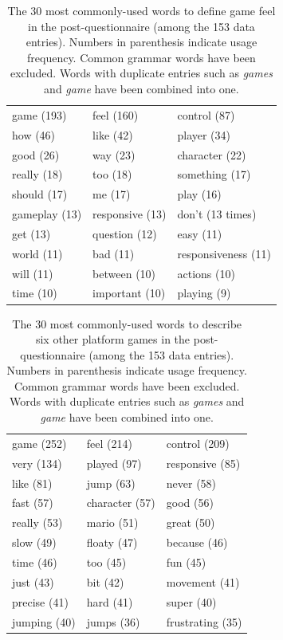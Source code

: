 \begin{table} \centering
\caption{The 30 most commonly-used words to define game feel in the post-questionnaire (among the 153 data entries). Numbers in parenthesis indicate usage frequency. Common grammar words have been excluded. Words with duplicate entries such as \textit{games} and \textit{game} have been combined into one.}
\label{table:mostWordsPost_GF}
\begin{tabular}{lll}
\toprule
game (193) & feel (160) & control (87)\\
how (46) & like (42) & player (34)\\
good (26) & way (23) & character (22)\\
really (18) & too (18) & something (17)\\
should (17) & me (17) & play (16)\\
gameplay (13) & responsive (13) & don't (13 times)\\
get (13) & question (12) & easy (11)\\
world (11) & bad (11) & responsiveness (11)\\
will (11) & between (10) & actions (10)\\
time (10) & important (10) & playing (9)\\
\bottomrule
\end{tabular}
\end{table}

\begin{table} \centering
\caption{The 30 most commonly-used words to describe six other platform games in the post-questionnaire (among the 153 data entries). Numbers in parenthesis indicate usage frequency. Common grammar words have been excluded. Words with duplicate entries such as \textit{games} and \textit{game} have been combined into one.}
\label{table:mostWordsPost}
\begin{tabular}{lll}
\toprule
game (252) & feel (214) & control (209)\\
very (134) & played (97) & responsive (85)\\
like (81) & jump (63) & never (58)\\
fast (57) & character (57) & good (56)\\
really (53) & mario (51) & great (50)\\
slow (49) & floaty (47) & because (46)\\
time (46) & too (45) & fun (45)\\
just (43) & bit (42) & movement (41)\\
precise (41) & hard (41) & super (40)\\
jumping (40) & jumps (36) & frustrating (35)\\
\bottomrule
\end{tabular}
\end{table}

